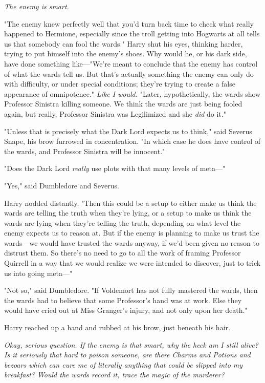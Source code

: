 \emph{The enemy is smart.}

"The enemy knew perfectly well that you'd turn back time to check what really 
happened to Hermione, especially since the troll getting into Hogwarts at all 
tells us that somebody can fool the wards." Harry shut his eyes, thinking 
harder, trying to put himself into the enemy's shoes. Why would he, or his dark 
side, have done something like---"We're meant to conclude that the enemy has 
control of what the wards tell us. But that's actually something the enemy can 
only do with difficulty, or under special conditions; they're trying to create 
a false appearance of omnipotence." \emph{Like I would.} "Later, 
hypothetically, the wards show Professor Sinistra killing someone. We think the 
wards are just being fooled again, but really, Professor Sinistra was 
Legilimized and she \emph{did} do it."

"Unless that is precisely what the Dark Lord expects us to think," said Severus 
Snape, his brow furrowed in concentration. "In which case he does have control 
of the wards, and Professor Sinistra will be innocent."

"Does the Dark Lord \emph{really} use plots with that many levels of meta---"

"Yes," said Dumbledore and Severus.

Harry nodded distantly. "Then this could be a setup to either make us think the 
wards are telling the truth when they're lying, or a setup to make us think the 
wards are lying when they're telling the truth, depending on what level the 
enemy expects us to reason at. But if the enemy is planning to make us trust 
the wards---we would have trusted the wards anyway, if we'd been given no 
reason to distrust them. So there's no need to go to all the work of framing 
Professor Quirrell in a way that we would realize we were intended to discover, 
just to trick us into going meta---"

"Not so," said Dumbledore. "If Voldemort has not fully mastered the wards, then 
the wards had to believe that some Professor's hand was at work. Else they 
would have cried out at Miss Granger's injury, and not only upon her death."

Harry reached up a hand and rubbed at his brow, just beneath his hair.

\emph{Okay, serious question. If the enemy is that smart, why the heck am I 
still alive? Is it seriously that hard to poison someone, are there Charms and 
Potions and bezoars which can cure me of literally anything that could be 
slipped into my breakfast? Would the wards record it, trace the magic of the 
murderer?}

